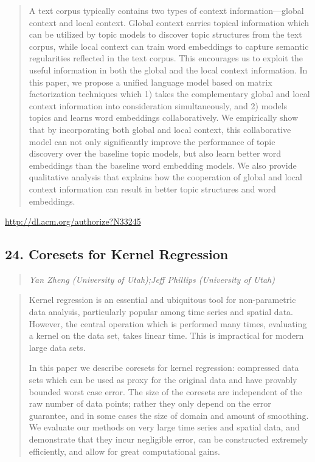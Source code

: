 \documentclass{article}
\begin{document}
\begin{quote}
A text corpus typically contains two types of context information—global context and local context. Global context carries topical information which can be utilized by topic models to discover topic structures from the text corpus, while local context can train word embeddings to capture semantic regularities reflected in the text corpus. This encourages us to exploit the useful information in both the global and the local context information. In this paper, we propose a unified language model based on matrix factorization techniques which 1) takes the complementary global and local context information into consideration simultaneously, and 2) models topics and learns word embeddings collaboratively. We empirically show that by incorporating both global and local context, this collaborative model can not only significantly improve the performance of topic discovery over the baseline topic models, but also learn better word embeddings than the baseline word embedding models. We also provide qualitative analysis that explains how the cooperation of global and local context information can result in better topic structures and word embeddings.
\end{quote}

\href{http://dl.acm.org/authorize?N33245}{http://dl.acm.org/authorize?N33245}

\subsection{24. Coresets for Kernel Regression}

\begin{quote}
\footnotesize{\textit{Yan Zheng (University of Utah);Jeff Phillips (University of Utah)}}

\end{quote}

\begin{quote}
Kernel regression is an essential and ubiquitous tool for non-parametric data analysis, particularly popular among time series and spatial data. However, the central operation which is performed many times, evaluating a kernel on the data set, takes linear time. This is impractical for modern large data sets. 







 In this paper we describe coresets for kernel regression: compressed data sets which can be used as proxy for the original data and have provably bounded worst case error. The size of the coresets are independent of the raw number of data points; rather they only depend on the error guarantee, and in some cases the size of domain and amount of smoothing. We evaluate our methods on very large time series and spatial data, and demonstrate that they incur negligible error, can be constructed extremely efficiently, and allow for great computational gains.
\end{quote}
\end{document}
